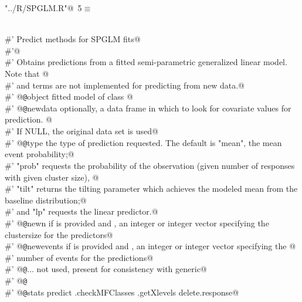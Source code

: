 \documentclass[reqno]{amsart}
\renewcommand{\NWtarget}[2]{\hypertarget{#1}{#2}}
\begin{document}
\begin{flushleft} \small\label{scrap5}\raggedright\small
\NWtarget{nuweb5}{} \verb@"../R/SPGLM.R"@\nobreak\ {\footnotesize {5}}$\equiv$
\vspace{-1ex}
\begin{list}{}{} \item
\mbox{}\verb@@\\
\mbox{}\verb@#' Predict methods for SPGLM fits@\\
\mbox{}\verb@#'@\\
\mbox{}\verb@#' Obtains predictions from a fitted semi-parametric generalized linear model. Note that @\\
\mbox{}\verb@#' and  terms are not implemented for predicting from new data.@\\
\mbox{}\verb@#' @{\tt @}\verb@param object fitted model of class @\\
\mbox{}\verb@#' @{\tt @}\verb@param newdata optionally, a data frame in which to look for covariate values for prediction. @\\
\mbox{}\verb@#'  If NULL, the original data set is used@\\
\mbox{}\verb@#' @{\tt @}\verb@param type the type of prediction requested. The default is "mean", the mean event probability;@\\
\mbox{}\verb@#' "prob" requests the probability of the observation (given number of responses with given cluster size), @\\
\mbox{}\verb@#' "tilt" returns the tilting parameter which achieves the modeled mean from the baseline distribution;@\\
\mbox{}\verb@#' and "lp" requests the linear predictor.@\\
\mbox{}\verb@#' @{\tt @}\verb@param newn if  is provided and , an integer or integer vector specifying the clustersize for the predictors@\\
\mbox{}\verb@#' @{\tt @}\verb@param newevents if  is provided and , an integer or integer vector specifying the @\\
\mbox{}\verb@#'  number of events for the predictions@\\
\mbox{}\verb@#' @{\tt @}\verb@param ... not used, present for consistency with generic@\\
\mbox{}\verb@#' @{\tt @}\verb@export@\\
\mbox{}\verb@#' @{\tt @}\verb@importFrom stats predict .checkMFClasses .getXlevels delete.response@\\

\end{list}
\end{flushleft}
\end{document}
